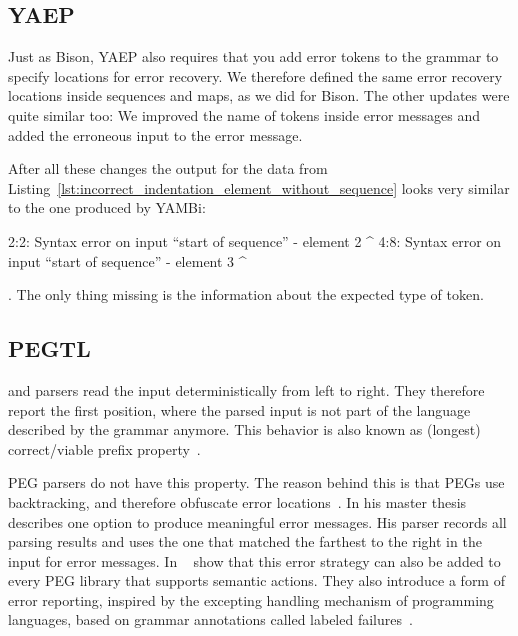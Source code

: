 \subsection{YAEP}

Just as Bison, \gls{YAEP} also requires that you add error tokens to the grammar to specify locations for error recovery. We therefore defined the same error recovery locations inside sequences and maps, as we did for Bison. The other updates were quite similar too: We improved the name of tokens inside error messages and added the erroneous input to the error message.

After all these changes the output for the  data from Listing~\ref{lst:incorrect_indentation_element_without_sequence} looks very similar to the one produced by YAMBi:

\begin{textcode}
2:2: Syntax error on input “start of sequence”
      - element 2
      ^
4:8: Syntax error on input “start of sequence”
            - element 3
            ^
\end{textcode}

. The only thing missing is the information about the expected type of token.

\subsection{PEGTL}

 and  parsers read the input deterministically from left to right. They therefore report the first position, where the parsed input is not part of the language described by the grammar anymore. This behavior is also known as (longest) correct/viable prefix property~\cite{sippu1990parsing, ruefenacht2016error, maidl2016labeled, pottier2016reachability}.

\Gls{PEG} parsers do not have this property. The reason behind this is that \glspl{PEG} use backtracking, and therefore obfuscate error locations~\cite{ruefenacht2016error}. In his master thesis~\cite{ford2002packrat} \citeauthor{ford2002packrat} describes one option to produce meaningful error messages. His parser records all parsing results and uses the one that matched the farthest to the right in the input for error messages. In ~\cite{maidl2016labeled} \citeauthor{maidl2016labeled} show that this error strategy can also be added to every \gls{PEG} library that supports semantic actions. They also introduce a form of error reporting, inspired by the excepting handling mechanism of programming languages, based on grammar annotations called labeled failures~\cite{maidl2016labeled}.

